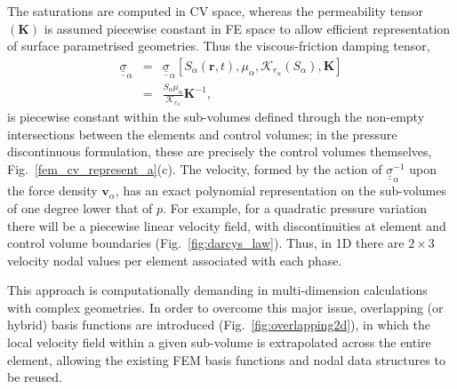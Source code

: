 \documentclass[preprint,authoryear,12pt]{elsarticle}
\newcommand{\jrp}[1]{\todo[color=blue!30, size=\small]{JRP: #1}}
\begin{document}
The saturations are computed in CV space, whereas the permeability tensor $\left(\mathbf{K}\right)$ is assumed piecewise constant in FE space to allow efficient representation of surface parametrised geometries. Thus the viscous-friction damping tensor, %
\begin{eqnarray}
  {\underline {\underline \sigma}}_{\alpha} &=& {\underline {\underline \sigma}}_{\alpha} \left[S_{\alpha}\left(\mathbf{r},t\right), \mu_{\alpha}, \mathcal{K}_{{r}_\alpha}\left(S_{\alpha}\right), \mathbf{K}\right] \nonumber \\
&=& \frac{S_{\alpha}\mu_{\alpha}}{\mathcal{K}_{{r}_\alpha}}\mathbf{K}^{-1},
\end{eqnarray}
is piecewise constant within the sub-volumes defined through the non-empty intersections between the elements and control volumes; in the pressure discontinuous formulation, these are precisely the control volumes themselves, Fig.~\ref{fem_cv_represent_a}(c). The velocity, formed by the action of ${\underline{\underline \sigma}}_{\alpha}^{-1}$ upon the force density $\mathbf{v}_\alpha$, has an exact polynomial representation on the sub-volumes of one degree lower that of $p$. For example, for a quadratic pressure variation there will be a piecewise linear velocity field, with discontinuities at element and control volume boundaries (Fig.~\ref{fig:darcys_law}). Thus, in 1D there are $2\times 3$ velocity nodal values per element associated with each phase. 

This approach is computationally demanding in multi-dimension calculations with complex geometries. In order to overcome this major issue, overlapping (or hybrid) basis functions are introduced (Fig.~\ref{fig:overlapping2d}), in which the local velocity field within a given sub-volume is extrapolated across the entire element, allowing the existing FEM basis functions and nodal data structures to be reused.
\end{document}
